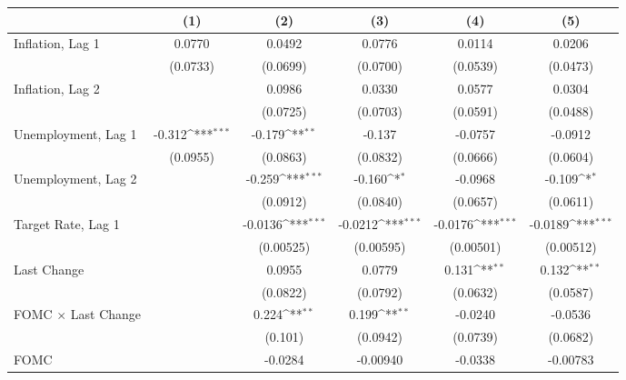{
\def\sym#1{\ifmmode^{#1}\else\(^{#1}\)\fi}
\begin{tabular}{l*{5}{c}}
\toprule
                &\multicolumn{1}{c}{(1)}         &\multicolumn{1}{c}{(2)}         &\multicolumn{1}{c}{(3)}         &\multicolumn{1}{c}{(4)}         &\multicolumn{1}{c}{(5)}         \\
\midrule
Inflation, Lag 1&   0.0770         &   0.0492         &   0.0776         &   0.0114         &   0.0206         \\
                & (0.0733)         & (0.0699)         & (0.0700)         & (0.0539)         & (0.0473)         \\
Inflation, Lag 2&                  &   0.0986         &   0.0330         &   0.0577         &   0.0304         \\
                &                  & (0.0725)         & (0.0703)         & (0.0591)         & (0.0488)         \\
Unemployment, Lag 1&   -0.312\sym{***}&   -0.179\sym{**} &   -0.137         &  -0.0757         &  -0.0912         \\
                & (0.0955)         & (0.0863)         & (0.0832)         & (0.0666)         & (0.0604)         \\
Unemployment, Lag 2&                  &   -0.259\sym{***}&   -0.160\sym{*}  &  -0.0968         &   -0.109\sym{*}  \\
                &                  & (0.0912)         & (0.0840)         & (0.0657)         & (0.0611)         \\
Target Rate, Lag 1&                  &  -0.0136\sym{***}&  -0.0212\sym{***}&  -0.0176\sym{***}&  -0.0189\sym{***}\\
                &                  &(0.00525)         &(0.00595)         &(0.00501)         &(0.00512)         \\
Last Change     &                  &   0.0955         &   0.0779         &    0.131\sym{**} &    0.132\sym{**} \\
                &                  & (0.0822)         & (0.0792)         & (0.0632)         & (0.0587)         \\
FOMC $\times$ Last Change&                  &    0.224\sym{**} &    0.199\sym{**} &  -0.0240         &  -0.0536         \\
                &                  &  (0.101)         & (0.0942)         & (0.0739)         & (0.0682)         \\
FOMC            &                  &  -0.0284         & -0.00940         &  -0.0338         & -0.00783         \\

\end{tabular}}
